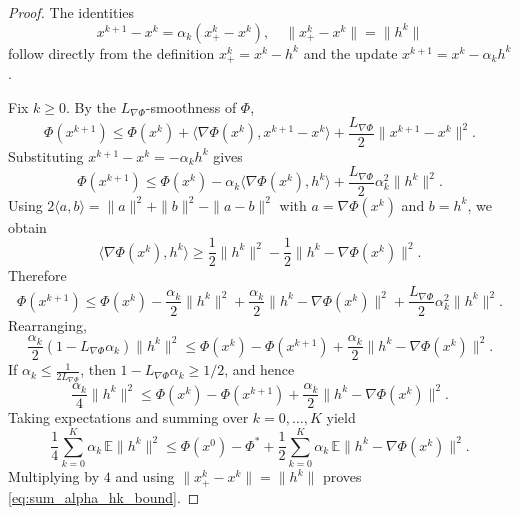 \documentclass{pkumelon}
\theoremstyle{plain}
\newcommand{\E}{\mathbb{E}}
\newcommand{\Phiobj}{\Phi}
\begin{document}
\begin{proof}
The identities
\begin{equation*}
x^{k+1}-x^k=\alpha_k(x_+^k-x^k), \quad \|x_+^k-x^k\|=\|h^k\|
\end{equation*}
follow directly from the definition $x_+^k=x^k-h^k$ and the update $x^{k+1}=x^k-\alpha_k h^k$.

Fix $k\ge 0$. By the $L_{\nabla\Phi}$-smoothness of $\Phiobj$,
\begin{equation*}
\Phiobj(x^{k+1}) \le \Phiobj(x^k) +\langle \nabla\Phiobj(x^k),x^{k+1}-x^k\rangle +\frac{L_{\nabla\Phi}}{2}\|x^{k+1}-x^k\|^2.
\end{equation*}
Substituting $x^{k+1}-x^k=-\alpha_k h^k$ gives
\begin{equation*}
\Phiobj(x^{k+1}) \le \Phiobj(x^k)-\alpha_k\langle \nabla\Phiobj(x^k),h^k\rangle +\frac{L_{\nabla\Phi}}{2}\alpha_k^2\|h^k\|^2.
\end{equation*}
Using $2\langle a,b\rangle=\|a\|^2+\|b\|^2-\|a-b\|^2$ with $a=\nabla\Phiobj(x^k)$ and $b=h^k$, we obtain
\begin{equation*}
\langle \nabla\Phiobj(x^k),h^k\rangle \ge \frac12\|h^k\|^2-\frac12\|h^k-\nabla\Phiobj(x^k)\|^2.
\end{equation*}
Therefore
\begin{equation*}
\Phiobj(x^{k+1}) \le \Phiobj(x^k) -\frac{\alpha_k}{2}\|h^k\|^2 +\frac{\alpha_k}{2}\|h^k-\nabla\Phiobj(x^k)\|^2 +\frac{L_{\nabla\Phi}}{2}\alpha_k^2\|h^k\|^2.
\end{equation*}
Rearranging,
\begin{equation*}
\frac{\alpha_k}{2}(1-L_{\nabla\Phi}\alpha_k)\|h^k\|^2 \le \Phiobj(x^k)-\Phiobj(x^{k+1}) +\frac{\alpha_k}{2}\|h^k-\nabla\Phiobj(x^k)\|^2.
\end{equation*}
If $\alpha_k\le \frac{1}{2L_{\nabla\Phi}}$, then $1-L_{\nabla\Phi}\alpha_k\ge 1/2$, and hence
\begin{equation*}
\frac{\alpha_k}{4}\|h^k\|^2 \le \Phiobj(x^k)-\Phiobj(x^{k+1}) +\frac{\alpha_k}{2}\|h^k-\nabla\Phiobj(x^k)\|^2.
\end{equation*}
Taking expectations and summing over $k=0,\ldots,K$ yield
\begin{equation*}
\frac14\sum_{k=0}^{K}\alpha_k\,\E\|h^k\|^2 \le \Phiobj(x^0)-\Phiobj^* +\frac12\sum_{k=0}^{K}\alpha_k\,\E\|h^k-\nabla\Phiobj(x^k)\|^2.
\end{equation*}
Multiplying by $4$ and using $\|x_+^k-x^k\|=\|h^k\|$ proves \eqref{eq:sum_alpha_hk_bound}.
\end{proof}
\end{document}
